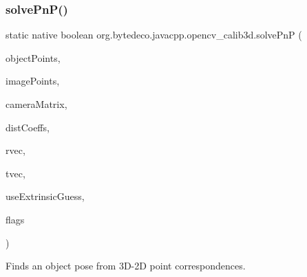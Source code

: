 \subsubsection{\texorpdfstring{solve\+Pn\+P()}{solvePnP()}}
{\footnotesize\ttfamily static native boolean org.\+bytedeco.\+javacpp.\+opencv\+\_\+calib3d.\+solve\+PnP (\begin{DoxyParamCaption}\item[{@By\+Val Mat}]{object\+Points,  }\item[{@By\+Val Mat}]{image\+Points,  }\item[{@By\+Val Mat}]{camera\+Matrix,  }\item[{@By\+Val Mat}]{dist\+Coeffs,  }\item[{@By\+Val Mat}]{rvec,  }\item[{@By\+Val Mat}]{tvec,  }\item[{@Cast(\char`\"{}bool\char`\"{}) boolean}]{use\+Extrinsic\+Guess,  }\item[{int}]{flags }\end{DoxyParamCaption})\hspace{0.3cm}{\ttfamily [static]}}



Finds an object pose from 3\+D-\/2D point correspondences. 


